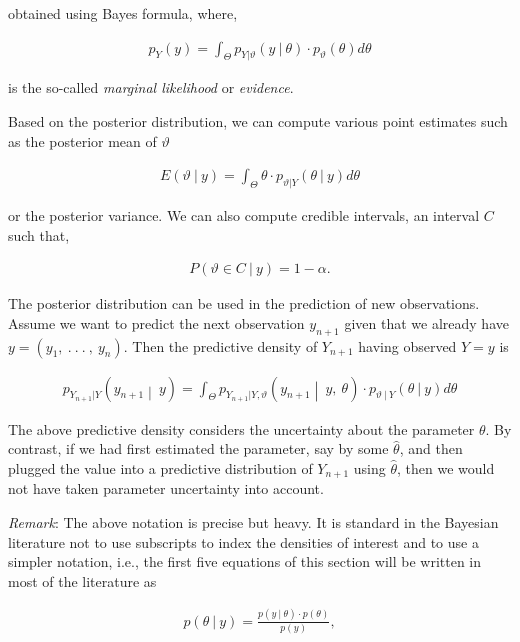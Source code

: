 obtained using Bayes formula, where,

\begin{align}p_{Y}(y) = \int_{\Theta}^{}{p_{Y|\vartheta}(y\ |\ \theta) \cdot p_{\vartheta}(\theta)}d\theta\end{align}

is the so-called \emph{marginal likelihood} or \emph{evidence}.

Based on the posterior distribution, we can compute various point
estimates such as the posterior mean of \(\vartheta\)

\begin{align}E(\vartheta\ |\ y) = \int_{\Theta}^{}{\theta \cdot p_{\vartheta|Y}(\theta\ |\ y)}d\theta\end{align}

or the posterior variance. We can also compute credible intervals, an
interval \(C\) such that,

\begin{align}P(\vartheta \in C\ |\ y) = 1 - \alpha.\end{align}

The posterior distribution can be used in the prediction of new
observations. Assume we want to predict the next observation
\(y_{n + 1}\) given that we already have
\(y = (y_{1},\ .\ .\ .\ ,\ y_{n})\). Then the predictive density of
\(Y_{n + 1}\) having observed \(Y = y\) is

\begin{align}p_{Y_{n + 1}|Y}\left( y_{n + 1} \middle| \ y \right) = \int_{\Theta}^{}{p_{Y_{n + 1}|Y,\vartheta}\left( y_{n + 1} \middle| \ y,\ \theta \right) \cdot p_{\vartheta\ |\ Y}(\theta\ |\ y)}d\theta\end{align}

The above predictive density considers the uncertainty about the
parameter \(\theta\). By contrast, if we had ﬁrst estimated the
parameter, say by some \(\widehat{\theta}\), and then plugged the value
into a predictive distribution of \(Y_{n + 1}\) using
\(\widehat{\theta}\), then we would not have taken parameter uncertainty
into account.

\emph{Remark}: The above notation is precise but heavy. It is standard
in the Bayesian literature not to use subscripts to index the densities
of interest and to use a simpler notation, i.e., the first five
equations of this section will be written in most of the literature as

\begin{align}p(\theta\ |\ y) = \frac{p(y\ |\ \theta) \cdot p(\theta)}{p(y)},\end{align}


